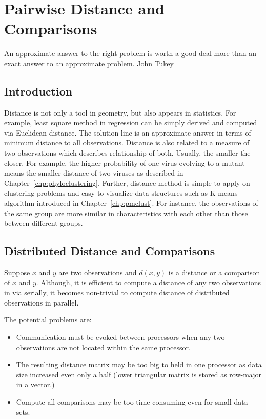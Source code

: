 \chapter{Pairwise Distance and Comparisons}
\label{chp:pairwise}

\inspire%
{An approximate answer to the right problem is worth a good deal more than
an exact answer to an approximate problem.}%
{John Tukey}


\section{Introduction}

Distance is not only a tool in geometry, but also appears in statistics. For
example, least square method in regression can be simply derived and computed
via Euclidean distance. The solution line is an approximate answer
in terms of minimum distance to all observations. Distance is also related
to a measure of two observations which describes relationship of both.
Usually, the smaller the closer. For example, the higher probability of
one virus evolving to a mutant means the smaller distance of two viruses
as described in Chapter~\ref{chp:phyloclustering}.
Further, distance method is simple to apply on clustering problems
and easy to visualize data structures such as K-means algorithm
introduced in Chapter~\ref{chp:pmclust}. For instance,
the observations of the same group are more similar in characteristics with
each other than those between different groups.


\section{Distributed Distance and Comparisons}

Suppose $x$ and $y$ are two observations and $d(x, y)$ is a distance or
a comparison of $x$ and $y$.
Although, it is efficient to compute a distance of any two observations
in  via  serially, it becomes non-trivial to
compute distance of distributed observations in parallel.

The potential problems are:
\begin{itemize}
\item
Communication must be evoked between processors when any two observations
are not located within the same processor.
\item
The resulting distance matrix may be too big
to held in one processor as data size increased even only a half (lower
triangular matrix is stored as row-major in a vector.)
\item
Compute all comparisons may be too time consuming even for small data sets. 
\end{itemize}

